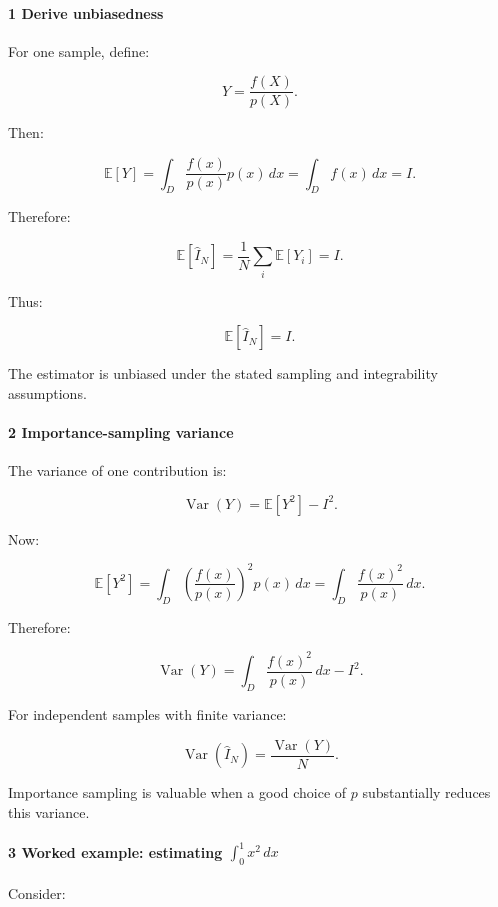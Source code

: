 \paragraph{1 Derive unbiasedness}\label{02-foundations-ii-ch029-derive-unbiasedness}

\hypertarget{02-foundations-ii-ch029-derive-unbiasedness}{}

For one sample, define:

\[
 Y=\frac{f(X)}{p(X)}.
\]

Then:

\[
 \mathbb E[Y] = \int_D \frac{f(x)}{p(x)}p(x)\,dx = \int_Df(x)\,dx =I.
\]

Therefore:

\[
 \mathbb E[\widehat I_N] = \frac1N\sum_i\mathbb E[Y_i] =I.
\]

Thus:

\[
 \boxed{ \mathbb E[\widehat I_N]=I }.
\]

The estimator is unbiased under the stated sampling and integrability assumptions.

\paragraph{2 Importance-sampling variance}\label{02-foundations-ii-ch029-importance-sampling-variance}

\hypertarget{02-foundations-ii-ch029-importance-sampling-variance}{}

The variance of one contribution is:

\[
 \operatorname{Var}(Y) = \mathbb E[Y^2]-I^2.
\]

Now:

\[
 \mathbb E[Y^2] = \int_D \left(\frac{f(x)}{p(x)}\right)^2p(x)\,dx = \int_D\frac{f(x)^2}{p(x)}\,dx.
\]

Therefore:

\[
 \boxed{ \operatorname{Var}(Y) = \int_D\frac{f(x)^2}{p(x)}\,dx-I^2 }.
\]

For independent samples with finite variance:

\[
 \boxed{ \operatorname{Var}(\widehat I_N) = \frac{\operatorname{Var}(Y)}{N} }.
\]

Importance sampling is valuable when a good choice of \(p\) substantially reduces this variance.

\begin{allmightroleexample}

\paragraph{\texorpdfstring{3 Worked example: estimating \(\int_0^1x^2\,dx\)}{3 Worked example: estimating \textbackslash int\_0\^{}1x\^{}2\textbackslash,dx}}\label{02-foundations-ii-ch029-worked-example-estimating-int_01x2dx}

\hypertarget{02-foundations-ii-ch029-worked-example-estimating-int_01x2dx}{}

Consider:

\end{allmightroleexample}

